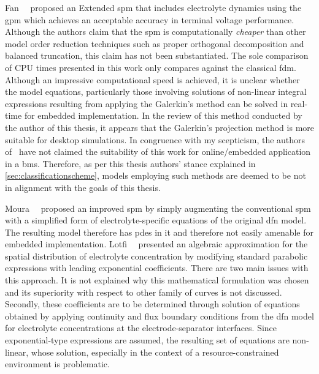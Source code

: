 Fan~\etal~\cite{Fan2016}   proposed   an   Extended  \gls{spm}   that   includes
electrolyte dynamics using  the \gls{gpm} which achieves  an acceptable accuracy
in terminal voltage  performance. Although the authors claim  that the \gls{spm}
is computationally  \emph{cheaper} than  other model order  reduction techniques
such as proper orthogonal decomposition  and balanced truncation, this claim has
not  been substantiated.  The sole  comparison of  CPU times  presented in  this
work  only compares  against  the classical  \gls{fdm}.  Although an  impressive
computational  speed is  achieved, it  is unclear  whether the  model equations,
particularly  those  involving  solutions  of  non-linear  integral  expressions
resulting from  applying the Galerkin's  method can  be solved in  real-time for
embedded implementation.  In the review of  this method conducted by  the author
of  this thesis,  it  appears  that the  Galerkin's  projection  method is  more
suitable  for  desktop  simulations.  In  congruence  with  my  scepticism,  the
authors  of~\cite{Fan2016} have  not claimed  the suitability  of this  work for
online/embedded  application  in a  \gls{bms}.  Therefore,  as per  this  thesis
authors' stance  explained in \cref{sec:classificationscheme},  models employing
such methods are deemed to be not in alignment with the goals of this thesis.

Moura~\etal~\cite{Moura2017} proposed an improved \gls{spm} by simply augmenting
the  conventional  \gls{spm}  with  a simplified  form  of  electrolyte-specific
equations of  the original  \gls{dfn} model. The  resulting model  therefore has
\glspl{pde} in it and therefore not easily amenable for embedded implementation.
Lotfi~\etal~\cite{Lotfi2017}  presented  an   algebraic  approximation  for  the
spatial  distribution   of  electrolyte  concentration  by   modifying  standard
parabolic expressions with leading exponential  coefficients. There are two main
issues with this approach. It is not explained why this mathematical formulation
was chosen  and its superiority  with respect to other  family of curves  is not
discussed. Secondly, these coefficients are to be determined through solution of
equations obtained by applying continuity  and flux boundary conditions from the
\gls{dfn}  model  for  electrolyte  concentrations  at  the  electrode-separator
interfaces. Since exponential-type expressions are assumed, the resulting set of
equations  are  non-linear, whose  solution,  especially  in  the context  of  a
resource-constrained environment is problematic.

